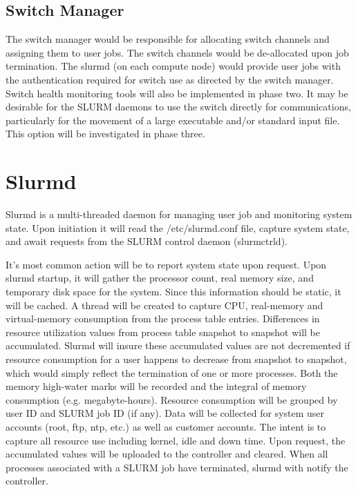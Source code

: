 \subsection{Switch Manager}

The switch manager would be responsible for allocating switch channels and assigning 
them to user jobs. The switch channels would be de-allocated upon job termination. 
The slurmd (on each compute node) would provide user jobs with the authentication 
required for switch use as directed by the switch manager. Switch health monitoring tools will 
also be implemented in phase two. It may be desirable for the SLURM daemons to use the
switch directly for communications, particularly for the movement of a large 
executable and/or standard input file. This option will be investigated in phase
three. 

\section{Slurmd}

Slurmd is a multi-threaded daemon for managing user job and 
monitoring system state. 
Upon initiation it will read the /etc/slurmd.conf file, capture 
system state, and await requests from the SLURM control daemon 
(slurmctrld). 

It's most common action will be to report system state upon 
request. Upon slurmd startup, it will gather the processor 
count, real memory size, and temporary disk space for the 
system. Since this information should be static, it will be 
cached. A thread will be created to capture CPU, real-memory 
and virtual-memory consumption from the process table entries. 
Differences in resource utilization values from process table 
snapshot to snapshot will be accumulated. Slurmd will 
insure these accumulated values are not decremented if resource 
consumption for a user happens to decrease from snapshot to 
snapshot, which would simply reflect the termination of 
one or more processes.
Both the memory high-water marks will be recorded and the 
integral of memory consumption (e.g. megabyte-hours).
Resource consumption will be grouped by user ID and 
SLURM job ID (if any). Data will be collected for 
system user accounts (root, ftp, ntp, etc.) as well as 
customer accounts. The intent is to capture all resource 
use including kernel, idle and down time. 
Upon request, the accumulated values will be uploaded to 
the controller and cleared. 
When all processes associated with a SLURM job have terminated, 
slurmd with notify the controller. 

